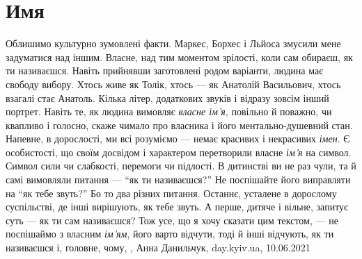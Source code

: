  
 
 
 
 
\chapter{Имя}

Облишимо культурно зумовлені факти. Маркес, Борхес і Льйоса змусили мене
задуматися над іншим. Власне, над тим моментом зрілості, коли сам обираєш, як
ти називаєшся. Навіть прийнявши заготовлені родом варіанти, людина має свободу
вибору. Хтось живе як Толік, хтось — як Анатолій Васильович, хтось взагалі стає
Анатоль. Кілька літер, додаткових звуків і відразу зовсім інший портрет. Навіть
те, як людина вимовляє \emph{власне ім'я}, повільно й поважно, чи квапливо і голосно,
скаже чимало про власника і його ментально-душевний стан.  Напевне, в
дорослості, ми всі розуміємо — немає красивих і некрасивих \emph{імен}. Є особистості,
що своїм досвідом і характером перетворили власне \emph{ім’я} на символ. Символ сили
чи слабкості, перемоги чи підлості.  В дитинстві ви не раз чули, та й самі
вимовляли питання — \enquote{як ти називаєшся?} Не поспішайте його виправляти на \enquote{як
тебе звуть?} Бо то два різних питання. Останнє, усталене в дорослому
суспільстві, де інші вирішують, як тебе звуть. А перше, дитяче і вільне,
запитує суть — як ти сам називаєшся?  Тож усе, що я хочу сказати цим текстом, —
не поспішаймо з власним \emph{ім’ям},  його варто відчути, тоді й інші відчують, як ти
називаєшся і, головне, чому,
, Анна Данильчук, day.kyiv.ua, 10.06.2021

